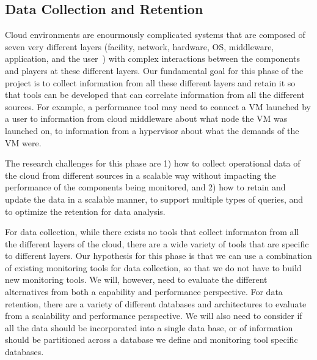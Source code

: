\subsection{Data Collection and Retention}

Cloud environments are enourmously complicated systems that are composed of seven very different layers (facility, network, hardware, OS, middleware, application, and the user~\cite{spring2011monitoring}) with complex interactions between the components and players at these different layers.  Our fundamental goal for this phase of the project is to collect information from all these different layers and retain it so that tools can be developed that can correlate information from all the different sources.  For example, a performance tool may need to connect a VM launched by a user to information from cloud middleware about what node the VM was launched on, to information from a hypervisor about what the demands of the VM were. 


The research challenges for this phase are 1) how to collect operational data of the cloud from different sources in a scalable way without impacting the performance of the components being monitored, and 2)  how to retain and update the data in a scalable manner, to support multiple types of queries, and to optimize the retention for data analysis.

For data collection, while there exists no tools that collect informaton from all the different layers of the cloud, there are a wide variety of tools that are specific to different layers.  Our hypothesis for this phase is that we can use a combination of existing monitoring tools for data collection, so that we do not have to build new monitoring tools.  We will, however, need to evaluate the different alternatives from both a capability and performance perspective.  
For data retention, there are a variety of different databases and architectures to evaluate from a scalability and performance perspective.  We will also need to consider if all the data should be incorporated into a single data base, or of information should be partitioned across a database we define and monitoring tool specific databases. 

